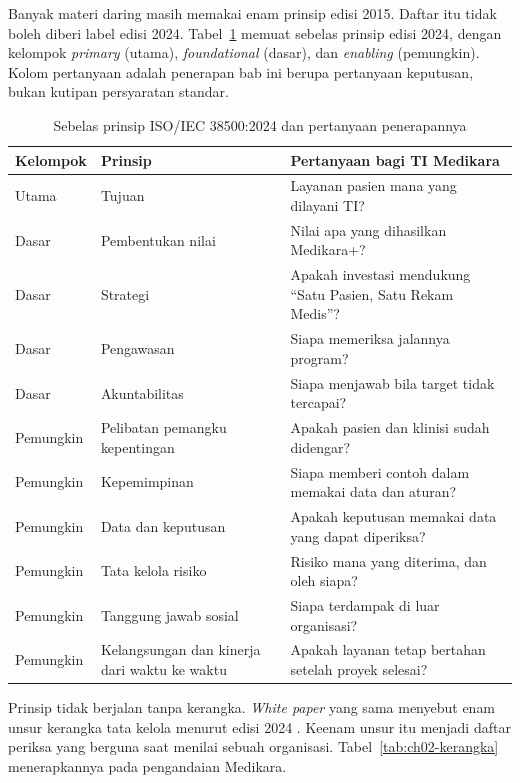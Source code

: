 Banyak materi daring masih memakai enam prinsip edisi 2015. Daftar itu tidak boleh diberi
label edisi 2024. Tabel~\ref{tab:ch02-prinsip} memuat sebelas prinsip edisi 2024, dengan
kelompok \textit{primary} (utama), \textit{foundational} (dasar), dan \textit{enabling}
(pemungkin). Kolom pertanyaan adalah penerapan bab ini berupa pertanyaan keputusan, bukan
kutipan persyaratan standar.

\begin{table}[!htb]
  \centering\small
  \caption{Sebelas prinsip ISO/IEC 38500:2024 dan pertanyaan penerapannya}
  \label{tab:ch02-prinsip}
  \begin{tabularx}{\textwidth}{|>{\raggedright\arraybackslash}p{}|>{\raggedright\arraybackslash}p{}|>{\raggedright\arraybackslash}X|}
    \hline
    \textbf{Kelompok} & \textbf{Prinsip} & \textbf{Pertanyaan bagi TI Medikara} \\ \hline
    Utama & Tujuan & Layanan pasien mana yang dilayani TI? \\ \hline
    Dasar & Pembentukan nilai & Nilai apa yang dihasilkan Medikara+? \\ \hline
    Dasar & Strategi & Apakah investasi mendukung ``Satu Pasien, Satu Rekam Medis''? \\
    \hline
    Dasar & Pengawasan & Siapa memeriksa jalannya program? \\ \hline
    Dasar & Akuntabilitas & Siapa menjawab bila target tidak tercapai? \\ \hline
    Pemungkin & Pelibatan pemangku kepentingan & Apakah pasien dan klinisi sudah didengar?
    \\ \hline
    Pemungkin & Kepemimpinan & Siapa memberi contoh dalam memakai data dan aturan? \\
    \hline
    Pemungkin & Data dan keputusan & Apakah keputusan memakai data yang dapat diperiksa? \\
    \hline
    Pemungkin & Tata kelola risiko & Risiko mana yang diterima, dan oleh siapa? \\ \hline
    Pemungkin & Tanggung jawab sosial & Siapa terdampak di luar organisasi? \\ \hline
    Pemungkin & Kelangsungan dan kinerja dari waktu ke waktu & Apakah layanan tetap bertahan
    setelah proyek selesai? \\ \hline
  \end{tabularx}
\end{table}

Prinsip tidak berjalan tanpa kerangka. \textit{White paper} yang sama menyebut enam unsur
kerangka tata kelola menurut edisi 2024 \cite{c02-iso-perubahan}. Keenam unsur itu menjadi
daftar periksa yang berguna saat menilai sebuah organisasi.
Tabel~\ref{tab:ch02-kerangka} menerapkannya pada pengandaian Medikara.

